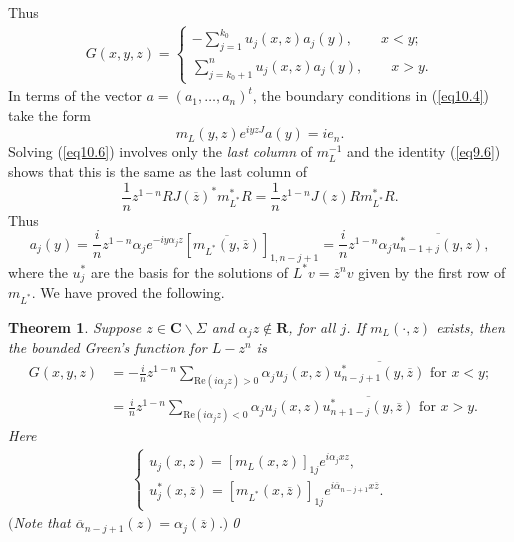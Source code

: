 \documentclass{surv-l}
\theoremstyle{plain}
\newtheorem{theorem}{Theorem}[section]
\theoremstyle{definition}
\numberwithin{equation}{chapter}
\begin{document}
Thus
\begin{align}\label{eq10.5}
G(x,y,z)=\left\{\begin{array}{l}
-\sum_{j=1}^{k_{0}}u_{j}(x, z)a_{j}(y),\qquad x<y;\\
\sum_{j=k_{0}+1}^{n}u_{j}(x, z)a_{j}(y),\qquad x>y.
\end{array}\right.
\end{align}
In terms of the vector $a = (a_{1},\ldots, a_{n})^{t}$, the boundary conditions in (\ref{eq10.4}) take the form
\begin{equation}\label{eq10.6}
m_{L}(y, z)e^{iyzJ}a(y)=ie_{n}.
\end{equation}
Solving (\ref{eq10.6}) involves only the  \emph{last column} of $m_{L}^{-1}$ and the identity (\ref{eq9.6}) shows that this is the same as the last column of
\begin{equation*}
\frac{1}{n}z^{1-n}RJ(\overline{z})^{*}m_{L^{*}}^{*}R=\frac{1}{n}z^{1-n}J(z)Rm_{L^{*}}^{*}R.
\end{equation*}
Thus
\begin{equation*}
a_{j}(y)=\frac{i}{n}z^{1-n}\alpha_{j}e^{-iy\alpha_{j}z}[\overline{m_{L^{*}}(y,\overline{z})}]_{1,n-j+1}=\frac{i}{n}
z^{1-n}\alpha_{j}\overline{u_{n-1+j}^{*}(y,z)},
\end{equation*}
where the $u_{j}^{*}$ are the basis for the solutions of $L^{*}v=\overline{z}^{n}v$ given by the first row of $ m_{L^{*}}$. We have proved the following.
\setcounter{theorem}{6}
\begin{theorem}\label{thm10.7} Suppose $ z\in \mathbf{C}\backslash \Sigma$ and $\alpha_{j}z\not\in \mathbf{R}$, for all $j$. If $m_{L}(\cdot,z)$ exists, then the bounded Green's function for $L-z^{n}$ is
\setcounter{equation}{7}
\begin{align}\label{eq10.8}
G(x, y, z)&=-\frac{i}{n}z^{1-n}\sum_{\mathrm{Re}(i\alpha_{j}z)>0}\alpha_{j}u_{j}(x, z)\overline{u_{n-j+1}^{*}(y,\overline{z})} \text{ for } x<y;\\ \nonumber
&=\frac{i}{n}z^{1-n}\sum_{\mathrm{Re}(i\alpha_{j}z)<0}\alpha_{j}u_{j}(x, z)\overline{u_{n+1-j}^{*}(y,\overline{z})} \text{ for } x>y.
\end{align}
Here
\begin{align}\label{eq10.9}
\left\{\begin{array}{l}
u_{j}(x, z)=[m_{L}(x, z)]_{1j}e^{i\alpha_{j}xz},\\
u_{j}^{*}(x, \overline{z})=[m_{L^{*}}(x, \overline{z})]_{1j}e^{i\overline{\alpha}_{n-j+1}x\overline{z}}.
\end{array}\right.
\end{align}
$($Note that $\overline{\alpha}_{n-j+1}(z) =\alpha_{j}(\overline{z}).)$\qed
\end{theorem}
\end{document}
